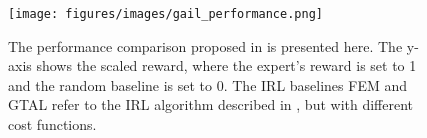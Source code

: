 \begin{figure}[tb]
    
    \texttt{[image: figures/images/gail\_performance.png]}
    \caption{The performance comparison proposed in \cite{ho2016gail} is presented here. The y-axis shows the scaled reward, where the expert's reward is set to 1 and the random baseline is set to 0. The IRL baselines FEM and GTAL refer to the IRL algorithm described in \cite{ho2016model}, but with different cost functions.}
    \label{fig:gail_performance}
    
\end{figure}
